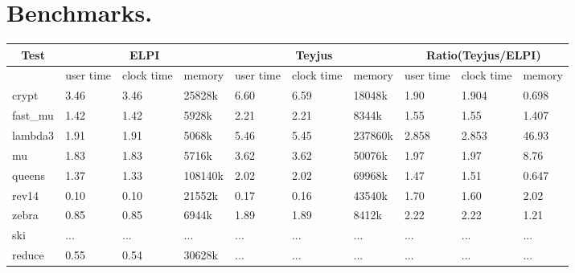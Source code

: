 \documentclass{llncs}
\begin{document}
\section{Benchmarks.}\label{sec:benchmarks}





\begin{center}

 \begin{table}
  \begin{tabular}{|p{1.2cm}||p{1.1cm}|p{1.1cm}|p{1.3cm}||p{1.1cm}|p{1.1cm}|p{1.3cm}||p{1.1cm}|p{1.1cm}|p{1.3cm}|}
    \hline
      \multicolumn{1}{|c||}{Test} &
      \multicolumn{3}{|c||}{ELPI} &
      \multicolumn{3}{|c||}{Teyjus} &
      \multicolumn{3}{|c|}{Ratio(Teyjus/ELPI)} \\
    \hline
      & user time & clock time & memory & user time & clock time & memory & user time & clock time & memory \\
    \hline
    crypt & 3.46 & 3.46 & 25828k & 6.60 & 6.59 & 18048k & 1.90 & 1.904 & 0.698 \\
    \hline
    fast\_mu & 1.42 & 1.42 & 5928k & 2.21 & 2.21 & 8344k & 1.55 & 1.55 & 1.407 \\
    \hline
    lambda3 & 1.91 & 1.91 & 5068k & 5.46 & 5.45 & 237860k & 2.858 & 2.853 & 46.93 \\
    \hline
    mu & 1.83 & 1.83 & 5716k & 3.62 & 3.62 & 50076k & 1.97 & 1.97 & 8.76 \\
    \hline
    queens & 1.37 & 1.33  & 108140k & 2.02 & 2.02 & 69968k & 1.47 & 1.51 & 0.647 \\
    \hline
    rev14 & 0.10 & 0.10 & 21552k & 0.17 & 0.16 & 43540k & 1.70 & 1.60 & 2.02 \\
    \hline
    zebra & 0.85 & 0.85 & 6944k & 1.89 & 1.89 & 8412k & 2.22 & 2.22 & 1.21 \\
    \hline
    ski & ... & ... & ... & ... & ... & ... & ... & ... & ... \\
    \hline
    reduce & 0.55 & 0.54 & 30628k & ... & ... & ... & ... & ... & ... \\
    \hline
  \end{tabular}
 \end{table}

 \end{center}



 
 


\end{document}

